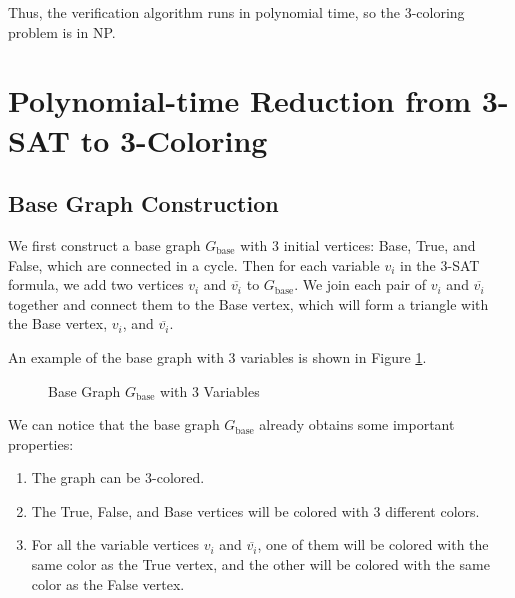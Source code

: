 \documentclass[a4paper,12pt]{article}
\begin{document}
Thus, the verification algorithm runs in polynomial time, so the 3-coloring problem is in NP.

\section{Polynomial-time Reduction from 3-SAT to 3-Coloring}

\subsection{Base Graph Construction}

We first construct a base graph $G_{\text{base}}$ with 3 initial vertices: Base, True, and False, which are connected in a cycle.
Then for each variable $v_i$ in the 3-SAT formula, we add two vertices $v_i$ and $\overline{v_i}$ to $G_{\text{base}}$.
We join each pair of $v_i$ and $\overline{v_i}$ together and connect them to the Base vertex, which will form a triangle with the Base vertex, $v_i$, and $\overline{v_i}$.

An example of the base graph with 3 variables is shown in Figure \ref{fig:base}.
\begin{figure}[H]
	\centering
	\caption{Base Graph $G_{\text{base}}$ with 3 Variables}
	\label{fig:base}
\end{figure}

We can notice that the base graph $G_{\text{base}}$ already obtains some important properties:
\begin{enumerate}
	\item The graph can be 3-colored.
	\item The True, False, and Base vertices will be colored with 3 different colors.
	\item For all the variable vertices $v_i$ and $\overline{v_i}$, one of them will be colored with the same color as the True vertex, and the other will be colored with the same color as the False vertex.
\end{enumerate}
\end{document}
